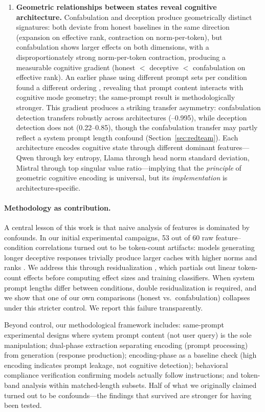 \begin{enumerate}[label=\textbf{Claim \arabic*:},leftmargin=*,itemsep=0.5em]
  \item \textbf{Geometric relationships between states reveal cognitive architecture.}
    Confabulation and deception produce geometrically distinct signatures: both deviate from honest baselines in the same direction (expansion on effective rank, contraction on norm-per-token), but confabulation shows larger effects on both dimensions, with a disproportionately strong norm-per-token contraction, producing a measurable cognitive gradient (honest $<$ deceptive $<$ confabulation on effective rank).
    An earlier phase using different prompt sets per condition found a different ordering \cite{phase3b}, revealing that prompt content interacts with cognitive mode geometry; the same-prompt result is methodologically stronger.
    This gradient produces a striking transfer asymmetry: confabulation detection transfers robustly across architectures (--0.995), while deception detection does not (0.22--0.85), though the confabulation transfer may partly reflect a system prompt length confound (Section~\ref{sec:redteam}).
    Each architecture encodes cognitive state through different dominant features---Qwen through key entropy, Llama through head norm standard deviation, Mistral through top singular value ratio---implying that the \emph{principle} of geometric cognitive encoding is universal, but its \emph{implementation} is architecture-specific.
\end{enumerate}

\paragraph{Methodology as contribution.}
A central lesson of this work is that naive analysis of \kvcache features is dominated by confounds.
In our initial experimental campaigns, 53 out of 60 raw feature--condition correlations turned out to be token-count artifacts: models generating longer deceptive responses trivially produce larger caches with higher norms and ranks \cite{kavi_audit,dwayne_audit}.
We address this through \fwl residualization \cite{frisch1933}, which partials out linear token-count effects before computing effect sizes and training classifiers.
When system prompt lengths differ between conditions, double residualization is required, and we show that one of our own comparisons (honest vs.\ confabulation) collapses under this stricter control.
We report this failure transparently.

Beyond \fwl control, our methodological framework includes: same-prompt experimental designs where system prompt content (not user query) is the sole manipulation; dual-phase extraction separating encoding (prompt processing) from generation (response production); encoding-phase \auroc as a baseline check (high encoding \auroc indicates prompt leakage, not cognitive detection); behavioral compliance verification confirming models actually follow instructions; and token-band analysis within matched-length subsets.
Half of what we originally claimed turned out to be confounds---the findings that survived are stronger for having been tested.

